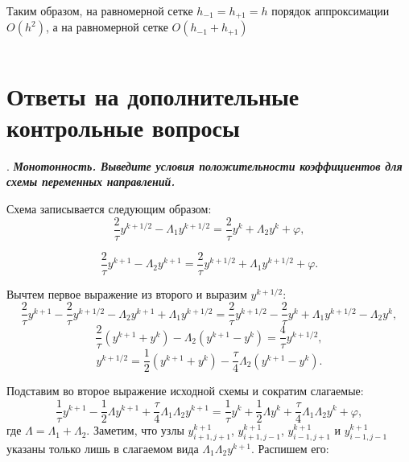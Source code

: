 \documentclass[12pt, a4paper]{article}
\newcounter{mycounter}
\newcommand{\quastion}[1]{%
	\stepcounter{mycounter}%
	\textbf{\themycounter}.  %
	\textbf{\textit{#1}}
	
}
\begin{document}
	Таким образом, на равномерной сетке $h_{-1} = h_{+1} = h$ порядок аппроксимации $O(h^2)$, а на равномерной сетке $O(h_{-1}+h_{+1})$
	
	\begin{equation*} 
	\end{equation*}
\bigskip
	\section{Ответы на дополнительные контрольные вопросы}
	\quastion{Монотонность. Выведите условия положительности коэффициентов для схемы переменных направлений.}
	
	Схема записывается следующим образом:
	\begin{equation*}
		\frac{2}{\tau} y^{k+1/2} - \Lambda_1 y^{k+1/2} = \frac{2}{\tau} y^k + \Lambda_2 y^k + \varphi,
	\end{equation*}
	
	\begin{equation*}
		\frac{2}{\tau} y^{k+1} - \Lambda_2 y^{k+1} = \frac{2}{\tau} y^{k+1/2} + \Lambda_1 y^{k+1/2} + \varphi.
	\end{equation*}
	
	Вычтем первое выражение из второго и выразим $y^{k+1/2}$:
	\begin{equation*}
		\frac{2}{\tau} y^{k+1} - \frac{2}{\tau} y^{k+1/2} - \Lambda_2 y^{k+1} + \Lambda_1 y^{k+1/2} = \frac{2}{\tau} y^{k+1/2} - \frac{2}{\tau} y^k + \Lambda_1 y^{k+1/2} - \Lambda_2 y^k,
	\end{equation*}
	\begin{equation*}
		\frac{2}{\tau} (y^{k+1} + y^k) - \Lambda_2 (y^{k+1} - y^k) = \frac{4}{\tau} y^{k+1/2},
	\end{equation*}
	\begin{equation*}
		y^{k+1/2} = \frac{1}{2} (y^{k+1} + y^k) - \frac{\tau}{4} \Lambda_2 (y^{k+1} - y^k).
	\end{equation*}
	
	Подставим во второе выражение исходной схемы и сократим слагаемые:
	\begin{equation*}
		\frac{1}{\tau} y^{k+1} - \frac{1}{2} \Lambda y^{k+1} + \frac{\tau}{4} \Lambda_1 \Lambda_2 y^{k+1} = \frac{1}{\tau} y^k + \frac{1}{2} \Lambda y^k + \frac{\tau}{4} \Lambda_1 \Lambda_2 y^k + \varphi,
	\end{equation*}
	где $\Lambda = \Lambda_1 + \Lambda_2$. Заметим, что узлы $y^{k+1}_{i+1,j+1}$, $y^{k+1}_{i+1,j-1}$, $y^{k+1}_{i-1,j+1}$ и $y^{k+1}_{i-1,j-1}$ указаны только лишь в слагаемом вида $\Lambda_1 \Lambda_2 y^{k+1}$. Распишем его:
	
\end{document}

